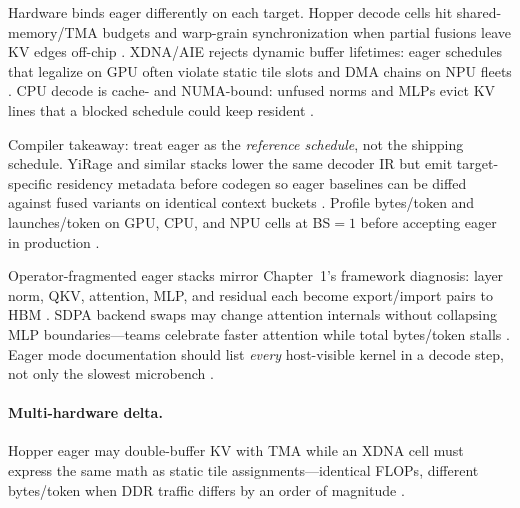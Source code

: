 Hardware binds eager differently on each target. Hopper decode cells hit shared-memory/TMA budgets and warp-grain synchronization when partial fusions leave KV edges off-chip \citep{nvidia2022hopper,semianalysis2024tma}. XDNA/AIE rejects dynamic buffer lifetimes: eager schedules that legalize on GPU often violate static tile slots and DMA chains on NPU fleets \citep{amd2024xdna,amd2024aie}. CPU decode is cache- and NUMA-bound: unfused norms and MLPs evict KV lines that a blocked schedule could keep resident \citep{dlbook,chen2020compilerbasedhardw}.

Compiler takeaway: treat eager as the \emph{reference schedule}, not the shipping schedule. YiRage and similar stacks lower the same decoder IR but emit target-specific residency metadata before codegen so eager baselines can be diffed against fused variants on identical context buckets \citep{yirage2026,chen2020compilerbasedhardw}. Profile bytes/token and launches/token on GPU, CPU, and NPU cells at BS${=}1$ before accepting eager in production \citep{taxbreak2026,memoryfloor2026,patel2025llminference}.

Operator-fragmented eager stacks mirror Chapter~1's framework diagnosis: layer norm, QKV, attention, MLP, and residual each become export/import pairs to HBM \citep{patel2025llminference,kwon2023vllm,taxbreak2026}. SDPA backend swaps may change attention internals without collapsing MLP boundaries---teams celebrate faster attention while total bytes/token stalls \citep{dao2022flashattention,dao2023flashdecoding,memoryfloor2026,yirage2026}. Eager mode documentation should list \emph{every} host-visible kernel in a decode step, not only the slowest microbench \citep{taxbreak2026,nvidia2024cudagraphs,semianalysis2024tma,amd2024xdna,dlbook,chen2020compilerbasedhardw,liu2024deepseekv3}.

\paragraph{Multi-hardware delta.} Hopper eager may double-buffer KV with TMA while an XDNA cell must express the same math as static tile assignments---identical FLOPs, different bytes/token when DDR traffic differs by an order of magnitude \citep{semianalysis2024tma,amd2024xdna,dlbook}.

